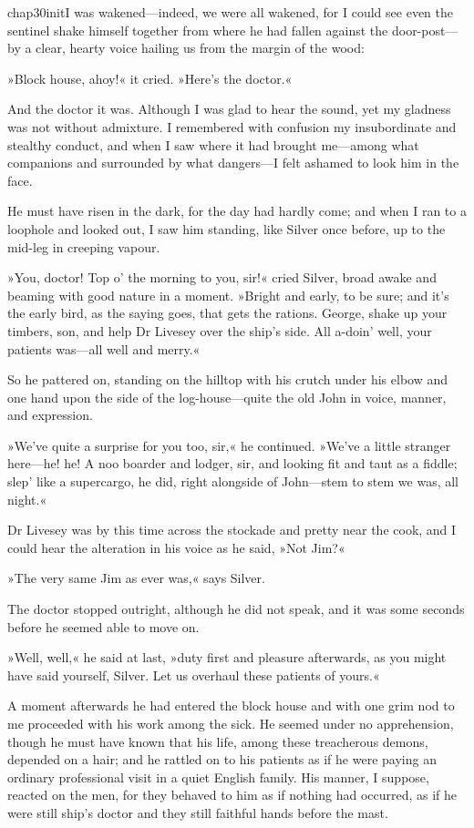 
   \lettrine[lines=4,image=true]{chap30initI}{} was wakened—indeed, we were all wakened, for I could see even the sentinel shake himself together from where he had fallen against the door-post—by a clear, hearty voice hailing us from the margin of the wood:

»Block house, ahoy!« it cried. »Here's the doctor.«

And the doctor it was. Although I was glad to hear the sound, yet my gladness was not without admixture. I remembered with confusion my insubordinate and stealthy conduct, and when I saw where it had brought me—among what companions and surrounded by what dangers—I felt ashamed to look him in the face.

He must have risen in the dark, for the day had hardly come; and when I ran to a loophole and looked out, I saw him standing, like Silver once before, up to the mid-leg in creeping vapour.

»You, doctor! Top o' the morning to you, sir!« cried Silver, broad awake and beaming with good nature in a moment. »Bright and early, to be sure; and it's the early bird, as the saying goes, that gets the rations. George, shake up your timbers, son, and help Dr Livesey over the ship's side. All a-doin' well, your patients was—all well and merry.«

So he pattered on, standing on the hilltop with his crutch under his elbow and one hand upon the side of the log-house—quite the old John in voice, manner, and expression.

»We've quite a surprise for you too, sir,« he continued. »We've a little stranger here—he! he! A noo boarder and lodger, sir, and looking fit and taut as a fiddle; slep' like a supercargo, he did, right alongside of John—stem to stem we was, all night.«

Dr Livesey was by this time across the stockade and pretty near the cook, and I could hear the alteration in his voice as he said, »Not Jim?«

»The very same Jim as ever was,« says Silver.

The doctor stopped outright, although he did not speak, and it was some seconds before he seemed able to move on.

»Well, well,« he said at last, »duty first and pleasure afterwards, as you might have said yourself, Silver. Let us overhaul these patients of yours.«

A moment afterwards he had entered the block house and with one grim nod to me proceeded with his work among the sick. He seemed under no apprehension, though he must have known that his life, among these treacherous demons, depended on a hair; and he rattled on to his patients as if he were paying an ordinary professional visit in a quiet English family. His manner, I suppose, reacted on the men, for they behaved to him as if nothing had occurred, as if he were still ship's doctor and they still faithful hands before the mast.

